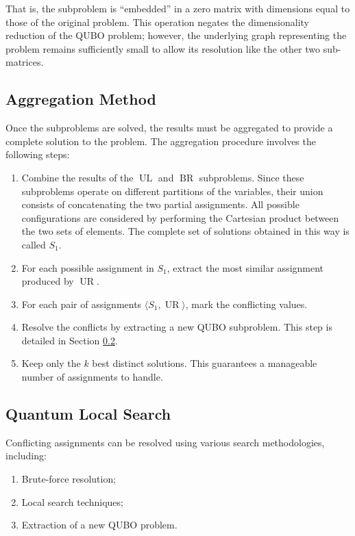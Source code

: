 That is, the subproblem is ``embedded'' in a zero matrix with dimensions equal to those of the original problem. 
This operation negates the dimensionality reduction of the QUBO problem; however, the underlying graph representing the problem remains sufficiently small to allow its resolution like the other two sub-matrices.

\subsection{Aggregation Method}\label{sec:aggr}

Once the subproblems are solved, the results must be aggregated to provide a complete solution to the problem.
The aggregation procedure involves the following steps: 
\begin{enumerate} 
	\item Combine the results of the $\operatorname{UL}$ and $\operatorname{BR}$ subproblems. Since these subproblems operate on different partitions of the variables, their union consists of concatenating the two partial assignments. 
    All possible configurations are considered by performing the Cartesian product between the two sets of elements. 
    The complete set of solutions obtained in this way is called $S_1$.
	\item For each possible assignment in $S_1$, extract the most similar assignment produced by $\operatorname{UR}$. 
    \item For each pair of assignments $\langle S_1,\operatorname{UR}\rangle$, mark the conflicting values. 
	\item Resolve the conflicts by extracting a new QUBO subproblem. This step is detailed in Section \ref{sec:qsearch}. 
	\item Keep only the $k$ best distinct solutions. This guarantees a manageable number of assignments to handle.
\end{enumerate}

\subsection{Quantum Local Search}\label{sec:qsearch}

Conflicting assignments can be resolved using various search methodologies, including: 
\begin{enumerate} 
	\item Brute-force resolution; 
	\item Local search techniques; 
	\item Extraction of a new QUBO problem. 
\end{enumerate}

